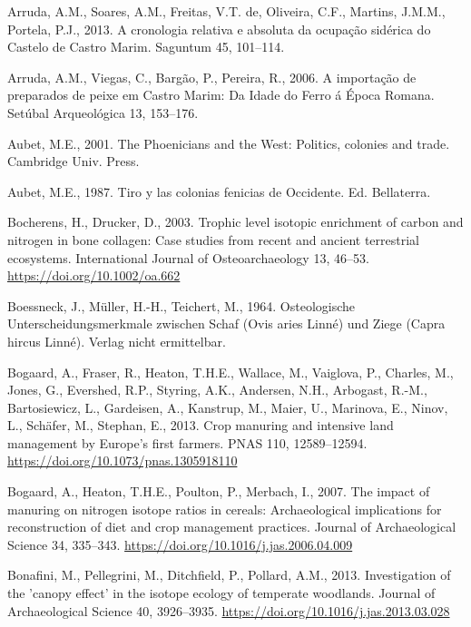 \documentclass[preprint, 3p, authoryear]{elsarticle} %
\newlength{\cslhangindent}
\newlength{\cslentryspacingunit} %
\newenvironment{CSLReferences}[2] %
 {%
  \setlength{\parindent}{0pt}
  \ifodd #1
  \let\oldpar\par
  \def\par{\hangindent=\cslhangindent\oldpar}
  \fi
  \setlength{\parskip}{#2\cslentryspacingunit}
 }%
 {}
\begin{document}
\begin{CSLReferences}{1}{0}
\leavevmode{}%
Arruda, A.M., Soares, A.M., Freitas, V.T. de, Oliveira, C.F., Martins, J.M.M., Portela, P.J., 2013. A cronologia relativa e absoluta da ocupação sidérica do {Castelo} de {Castro Marim}. Saguntum 45, 101--114.

\leavevmode{}%
Arruda, A.M., Viegas, C., Bargão, P., Pereira, R., 2006. A importação de preparados de peixe em {Castro Marim}: Da {Idade} do {Ferro} á {Época Romana}. Setúbal Arqueológica 13, 153--176.

\leavevmode{}%
Aubet, M.E., 2001. The {Phoenicians} and the {West}: Politics, colonies and trade. {Cambridge Univ. Press}.

\leavevmode{}%
Aubet, M.E., 1987. Tiro y las colonias fenicias de {Occidente}. {Ed. Bellaterra}.

\leavevmode{}%
Bocherens, H., Drucker, D., 2003. Trophic level isotopic enrichment of carbon and nitrogen in bone collagen: Case studies from recent and ancient terrestrial ecosystems. International Journal of Osteoarchaeology 13, 46--53. \url{https://doi.org/10.1002/oa.662}

\leavevmode{}%
Boessneck, J., Müller, H.-H., Teichert, M., 1964. Osteologische {Unterscheidungsmerkmale} zwischen {Schaf} ({Ovis} aries {Linné}) und {Ziege} ({Capra} hircus {Linné}). {Verlag nicht ermittelbar}.

\leavevmode{}%
Bogaard, A., Fraser, R., Heaton, T.H.E., Wallace, M., Vaiglova, P., Charles, M., Jones, G., Evershed, R.P., Styring, A.K., Andersen, N.H., Arbogast, R.-M., Bartosiewicz, L., Gardeisen, A., Kanstrup, M., Maier, U., Marinova, E., Ninov, L., Schäfer, M., Stephan, E., 2013. Crop manuring and intensive land management by {Europe}'s first farmers. PNAS 110, 12589--12594. \url{https://doi.org/10.1073/pnas.1305918110}

\leavevmode{}%
Bogaard, A., Heaton, T.H.E., Poulton, P., Merbach, I., 2007. The impact of manuring on nitrogen isotope ratios in cereals: Archaeological implications for reconstruction of diet and crop management practices. Journal of Archaeological Science 34, 335--343. \url{https://doi.org/10.1016/j.jas.2006.04.009}

\leavevmode{}%
Bonafini, M., Pellegrini, M., Ditchfield, P., Pollard, A.M., 2013. Investigation of the 'canopy effect' in the isotope ecology of temperate woodlands. Journal of Archaeological Science 40, 3926--3935. \url{https://doi.org/10.1016/j.jas.2013.03.028}


\end{CSLReferences}
\end{document}
